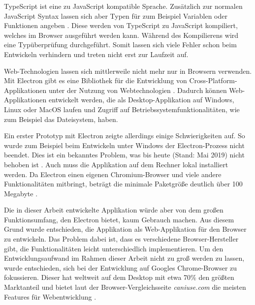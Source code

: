 TypeScript ist eine zu JavaScript kompatible Sprache. Zusätzlich zur normalen JavaScript Syntax lassen sich aber Typen für zum Beispiel Variablen oder Funktionen angeben \cite{typescript:mainpage}. Diese werden von TypeScript zu JavaScript kompiliert, welches im Browser ausgeführt werden kann. Während des Kompilierens wird eine Typüberprüfung durchgeführt. Somit lassen sich viele Fehler schon beim Entwickeln verhindern und treten nicht erst zur Laufzeit auf.

Web-Technologien lassen sich mittlerweile nicht mehr nur in Browsern verwenden. Mit Electron gibt es eine Bibliothek für die Entwicklung von Cross-Platform-Applikationen unter der Nutzung von Webtechnologien \cite{electron:about}. Dadurch können Web-Applikationen entwickelt werden, die als Desktop-Applikation auf Windows, Linux oder MacOS laufen und Zugriff auf Betriebssystemfunktionalitäten, wie zum Beispiel das Dateisystem, haben.

Ein erster Prototyp mit Electron zeigte allerdings einige Schwierigkeiten auf. So wurde zum Beispiel beim Entwickeln unter Windows der Electron-Prozess nicht beendet. Dies ist ein bekanntes Problem, was bis heute (Stand: Mai 2019) nicht behoben ist \cite{electron:processissue}. Auch muss die Applikation auf dem Rechner lokal installiert werden. Da Electron einen eigenen Chromium-Browser und viele andere Funktionalitäten mitbringt, beträgt die minimale Paketgröße deutlich über 100 Megabyte \cite{electron:sizeissue}.

Die in dieser Arbeit entwickelte Applikation würde aber von dem großen Funktionsumfang, den Electron bietet, kaum Gebrauch machen. Aus diesem Grund wurde entschieden, die Applikation als Web-Applikation für den Browser zu entwickeln. Das Problem dabei ist, dass es verschiedene Browser-Hersteller gibt, die Funktionalitäten leicht unterschiedlich implementieren. Um den Entwicklungsaufwand im Rahmen dieser Arbeit nicht zu groß werden zu lassen, wurde entschieden, sich bei der Entwicklung auf Googles Chrome-Browser zu fokussieren. Dieser hat weltweit auf dem Desktop mit etwa 70\% den größten Marktanteil \cite{statcounter:desktopbrowser} und bietet laut der Browser-Vergleichsseite \textit{caniuse.com} die meisten Features für Webentwicklung \cite{caniuse:home}.